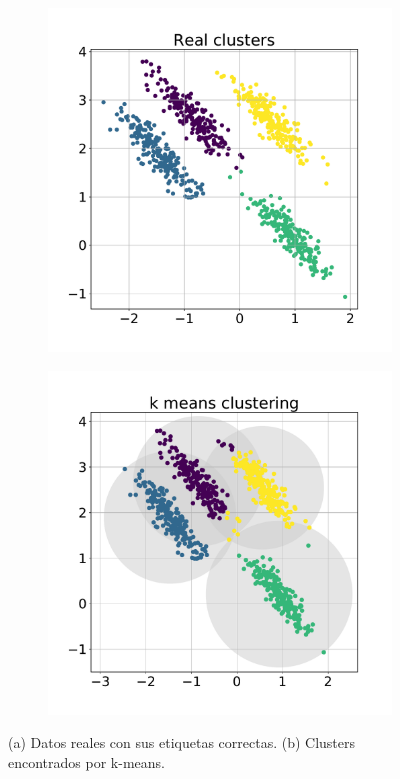 \begin{figure}[ht]
    \centering
    \begin{subfigure}[t]{0.5\linewidth}
        \centering
        \includegraphics[width=\linewidth]{img/real_clusters.pdf}
        \caption{}
    \end{subfigure}%
    \begin{subfigure}[t]{0.5\linewidth}
        \centering
        \includegraphics[width=\linewidth]{img/kmeans.pdf}
        \caption{}
    \end{subfigure}
    \caption{(a) Datos reales con sus etiquetas correctas. (b) Clusters encontrados por k-means.}
    \label{fig:kmeans}
\end{figure}

